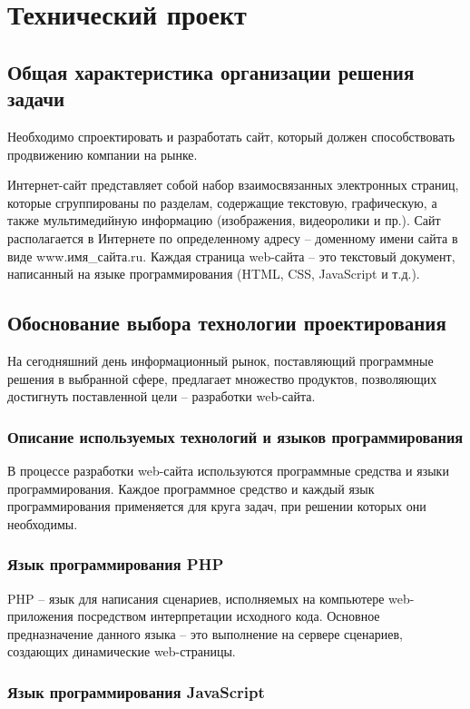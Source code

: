 \newpage
\section{Технический проект}
\subsection{Общая характеристика организации решения задачи}

Необходимо спроектировать и разработать сайт, который должен способствовать продвижению компании на рынке.

Интернет-сайт представляет собой набор взаимосвязанных электронных страниц, которые сгруппированы по разделам, содержащие текстовую, графическую, а также мультимедийную информацию (изображения, видеоролики и пр.). Сайт располагается в Интернете по определенному адресу – доменному имени сайта в виде www.имя\_сайта.ru. Каждая страница web-сайта – это текстовый документ, написанный на языке программирования (HTML, CSS, JavaScript и т.д.).

\subsection{Обоснование выбора технологии проектирования}

На сегодняшний день информационный рынок, поставляющий программные решения в выбранной сфере, предлагает множество продуктов, позволяющих достигнуть поставленной цели – разработки web-сайта.

\subsubsection{Описание используемых технологий и языков программирования}

В процессе разработки web-сайта используются программные средства и языки программирования. Каждое программное средство и каждый язык программирования применяется для круга задач, при решении которых они необходимы.

\subsubsection{Язык программирования PHP}
PHP – язык для написания сценариев, исполняемых на компьютере web-приложения посредством интерпретации исходного кода. Основное предназначение данного языка – это выполнение на сервере сценариев, создающих динамические web-страницы.
        
\subsubsection{Язык программирования JavaScript}

